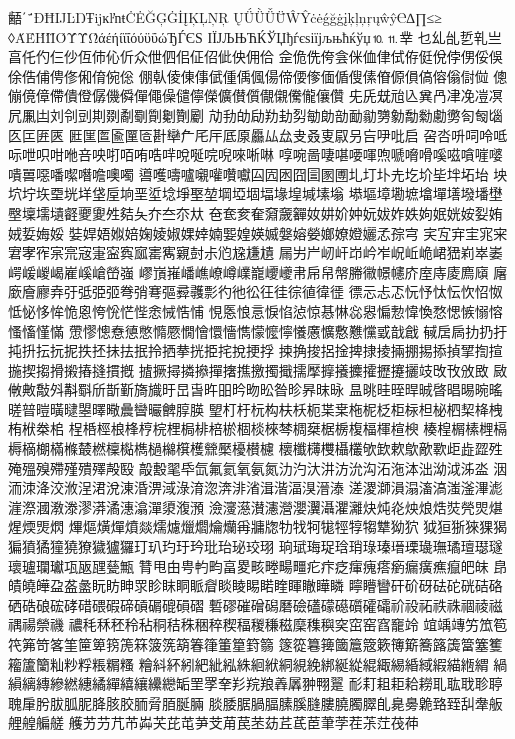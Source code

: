 𪘚΄΅ĐĦĲĿŊŦĳĸŀŉŧĊĖĞĢĠİĮĶĻŅŖ
ŲǗǛǙǕŴŶċėǵğġįķļņŗųŵŷ℮∆∏≤≥
◊ΆΈΉΊΪΌΎΫΏάέήίϊΐόύϋΰώЂЃЄЅ
ІЇЈЉЊЋЌЎЏђѓєѕіїјљњћќўџ⒑⒒丵
乜乣乨乴乵亗亯仛仢仨仯仾伂伈伒众伳伵佀佂佋佌佒佣佮
佱佹侁侉侌侎侐侓侙侟侹侻侼侽俀俁俆俈俌俜俢俰俼倇倊
倗倝倰倲倳倵偅偊偑偒偙偠偧偭偱傁傃傄傆傊傐傛傟傠傡
傯傰傹傽僀僓僜僝僟僢僤僶僺儙儜儝儣儧儨儬儭儯儱儴儹
兂兏兓兘兦兾冎冿凂凒凕凥凲凷刘刢剅剘剟劀劅劕劖劗劚
劥劧劰劶劷劸劽勄勆勏勔勜勥勨勪勬勴勶匌匓匘匛匞匥匧
匨匩匫匬匰匼卙卛厃厇厈厎厡厵厸厽叏叒叓叞叧吂吚吡启
呄呇呏呞呤呧呩呭呮咁咃咅咉咑咟哊哠哶哾唌唍唲唻唽啉
啍啘啚啛啿喓喗喣嗁嗋嗗嗘嗞嗿嘊嘙嘳嘼噁噃噄噆噡噢噣
噵嚄嚋嚧嚫嚾囋囐囜囥囦囧圁圂圑圠圢圤圥圪圿坒坢坧坮
坱坹坾垁垔垙垟垡垕垧垩垽埝埩埾堃堈埡堌堛堟堭堿塐塕
塨塸墇墈墌墖墠墡墢墦壄壂壈壖壝壡夒夓夝夡夨夰夳夵夶
夿奃奒奞奫奯奲奻妌妎妕妧妭妰妷姁姄姯姲姴姷娀娎娒娞
娤娨娪娰婄婅婈婌婐婞婻媐媓媖媙媻嫆嫈嫏嫽嬁孋孞孮宆
宎宐宑宔宨宩宭宯宱宲宺宼寁寍寏寙寚寯寴尌尗尦尮尲尵
屚屴屵屻屽岇岒岝岲岴峗峮峱峲崒崣崿嵈嵕嵑嵟嵠嵢嵤嵹
嵺嵿嶊嶓嶕嶛嶟嶫巃巎巙帇帍帠幋幐幑幜幰庎庢庤庱廌廎
廜廞廥廫弆弙弤弫弬弮弰弿彄彛彠彯彴彵彸彺徍徖徝徫徰
徱忈忐忑忨忬忲忶忺怊怓怟怭恀恈恑恖恗恱恾悂悆悈悎悑
悓悘悢悥悷惂惉惊惎惏惢惥惼愂愇愌愗愢愱愵愹慅慉慬慲
慸憀憁憃憄憋憜憠憪懀懁懎懏懞懡懧懩懬懭懯戁戃戜戠戧
戫扂扄扐扔扜扽抍抎抏抳抶抷抺抾抿拎拪拲挄挋挓挩挭捊
捒捔捘捛捦捭捸掕掚掤掦掭揁揅揈揎揓揳搊搰摋摏摓摜摡
摣撅撏撛撡撣撦撨撽擉擑擩擪擵攁攈攉攊攓攦攱攺攼攽敃
敐敒敟敽斘斠斣斦斮斳旖旘旴旵旾旿昍昑昒昖昝昣昦昩昹
昷晀晆晊晘晠晵晿晹晼暚暛暜暟曂曃曌曎曔曟曫曮朇朜朠
朢朾杅杬构枎枖枙枼枽柂柅柉柜柡柦柲柶栔栙栧栯栿桊桘
桯桰桱桹桻梈梡梩梮棑棓棜棝棪棶棽椆椉椐椖椱楅楎楦楰
楱楻榍榡榸槅槈樀樃樠樤樷橪檁檆檇檛檰檱檴檾檿櫌櫕櫖
櫰櫼欂欆欇欉欨欫欶歍歒歝歫歮歰殅殗殟殠殢殣殨殬殸殹
毃毄毣氒氙氟氦氧氨氮氻汋汏汫汸沇沟沰沲泍泏泑泧泲泴
洇洏洓洚洨浟浧涒涗涷涽淠淢淥淯淴渀渄渻湒湝湢湨溍溙
溠溭溮溳溻滀滈滍滏滭滮漄漈漍漖漛漻漭潏潓潝潬澃澓澦
澰濅濨濽瀗瀯瀴瀷灄灈灕炔炖炛炴烺焅焋焭焸煁煋煗煚熌
熚熰熿燀燌燚燸爈爉爓爚爤爯牅牎牞牫牱牻牼犉犓犨狕狖
狘狟狾猍猓猲猵獖獝獞獟獠獩獹玀玎玐玓玗玪玭珆珌珓珝
珦珷珻珿琀琑琭瑧瑨瑮璏璑璚璮璱璲瓌瓐瓓瓛瓨瓪瓼甆甒
甧甩甶甹畃畇畗畟畡畻畼疅疕疜疺瘒瘣瘩瘹瘺癀癄癙皅皌
皍皟皢皣盁盋盠盶眆眒眔眕眜眮眽睂睒睖睗睰睳睴瞮瞱瞵
矃矒矕矸砎砑砝砣硄硈硌硒硞硠硡硣碏碨碬碲碽碿磇磒磖
磛磟磪磳磶磿礆礚礞礠礩礭礵祄祋祏祑祩祻祾禌禑禓禜禨
禯秏秝秠秢秥秱秸秼稇稡稧稫稯稴稵穈穕穥穾窋窑窞竉竛
竩竬竱竻笟笣笩笰笴笿筀筪箄箉箎箖箥箲箶箺箻箽篂篈篛
篴篵篹篺簂簄簆簌簙簛簥簬簴簹簺籆籕籚籣籼粆粰粻糏糔
糩紏紑紖紦紪紭絑絗絥絧絸絻綁綖緃緄緅緆緍緎縀緢緪緭
緺縜縭縳縿繎繐繘繟繥纕纝纞缿罜罦羍羏羦羪羴羼翀翈翨
耏耓耝耟耠耮耴耾聀聄聤聭肁肹胈胍胒胮胲胶胹脋脜脠脼
腅腇腒腡腷膆膎膖膢膮臅臎臫臰臱臲臵臸舏舝舨艃艎艑艖
艧艻芀芁芇芔芖芘芚芛芠苚苠苤苭茊茋茞茟茡茬茮茳茷茽
